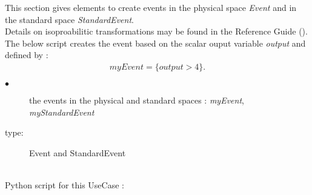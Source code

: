 \renewcommand{\filename}{docUC_ThresholdExceedance_Event.tex}
\renewcommand{\filetitle}{UC : Creation of an event in the physical and the standard spaces}

\HeaderIIILevel

\label{StandardPhysicalEvent}



This section gives elements to create events in the physical space {\itshape Event} and in the standard space {\itshape StandardEvent}.\\



Details on isoproabilitic transformations  may be found in the Reference Guide ().\\


The below script creates the event based on the scalar ouput variable  {\itshape output} and defined by :
\begin{align*}
  myEvent = \{ output > 4\}.
\end{align*}

             {
               \begin{description}
               \item[$\bullet$] the events in the physical and standard spaces : {\itshape myEvent}, {\itshape myStandardEvent}
               \item[type:] Event and StandardEvent
               \end{description}
             }

             \textspace\\
             Python script for this UseCase :

